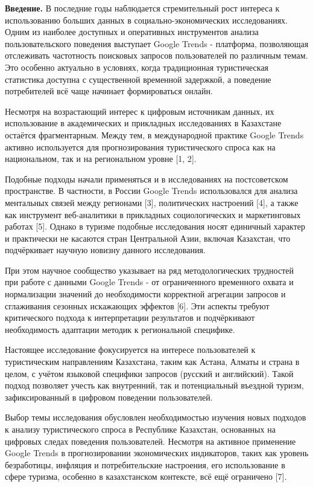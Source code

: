 \begin{multicols}{2}
{\bfseries Введение.} В последние годы наблюдается стремительный рост
интереса к использованию больших данных в социально-экономических
исследованиях. Одним из наиболее доступных и оперативных инструментов
анализа пользовательского поведения выступает Google Trends - платформа,
позволяющая отслеживать частотность поисковых запросов пользователей по
различным темам. Это особенно актуально в условиях, когда традиционная
туристическая статистика доступна с существенной временной задержкой, а
поведение потребителей всё чаще начинает формироваться онлайн.

Несмотря на возрастающий интерес к цифровым источникам данных, их
использование в академических и прикладных исследованиях в Казахстане
остаётся фрагментарным. Между тем, в международной практике Google
Trends активно используется для прогнозирования туристического спроса
как на национальном, так и на региональном уровне {[}1, 2{]}.

Подобные подходы начали применяться и в исследованиях на постсоветском
пространстве. В частности, в России Google Trends использовался для
анализа ментальных связей между регионами {[}3{]}, политических
настроений {[}4{]}, а также как инструмент веб-аналитики в прикладных
социологических и маркетинговых работах {[}5{]}. Однако в туризме
подобные исследования носят единичный характер и практически не касаются
стран Центральной Азии, включая Казахстан, что подчёркивает научную
новизну данного исследования.

При этом научное сообщество указывает на ряд методологических трудностей
при работе с данными Google Trends - от ограниченного временного охвата
и нормализации значений до необходимости корректной агрегации запросов и
сглаживания сезонных искажающих эффектов {[}6{]}. Эти аспекты требуют
критического подхода к интерпретации результатов и подчёркивают
необходимость адаптации методик к региональной специфике.

Настоящее исследование фокусируется на интересе пользователей к
туристическим направлениям Казахстана, таким как Астана, Алматы и страна
в целом, с учётом языковой специфики запросов (русский и английский).
Такой подход позволяет учесть как внутренний, так и потенциальный
въездной туризм, зафиксированный в цифровом поведении пользователей.

Выбор темы исследования обусловлен необходимостью изучения новых
подходов к анализу туристического спроса в Республике Казахстан,
основанных на цифровых следах поведения пользователей. Несмотря на
активное применение Google Trends в прогнозировании экономических
индикаторов, таких как уровень безработицы, инфляция и потребительские
настроения, его использование в сфере туризма, особенно в казахстанском
контексте, всё ещё ограничено {[}7{]}.


\end{multicols}
